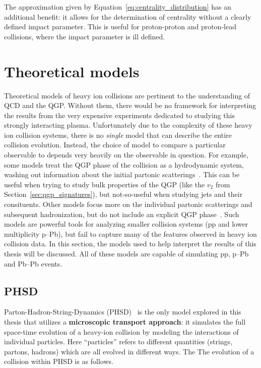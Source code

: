 The approximation given by Equation~\ref{eq:centrality_distribution} has an additional benefit: it allows for the determination of centrality without a clearly defined impact parameter. This is useful for proton-proton and proton-lead collisions, where the impact parameter is ill defined. 


\section{Theoretical models}
\label{sec:models}

Theoretical models of heavy ion collisions are pertinent to the understanding of QCD and the QGP. Without them, there would be no framework for interpreting the results from the very expensive experiments dedicated to studying this strongly interacting plasma. Unfortunately due to the complexity of these heavy ion collision systems, there is no \textit{single} model that can describe the entire collision evolution. Instead, the choice of model to compare a particular observable to depends very heavily on the observable in question. For example, some models treat the QGP phase of the collision as a hydrodynamic system, washing out information about the initial partonic scatterings~\cite{EPOS}. This can be useful when trying to study bulk properties of the QGP (like the $v_2$ from Section~\ref{sec:qgp_signatures}), but not-so-useful when studying jets and their consituents. Other models focus more on the individual partonic scatterings and subsequent hadronization, but do not include an explicit QGP phase~\cite{Pythia, DPMJet}. Such models are powerful tools for analyzing smaller collision systems (pp and lower multiplicity p--Pb), but fail to capture many of the features observed in heavy ion collision data. In this section, the models used to help interpret the results of this thesis will be discussed. All of these models are capable of simulating pp, p--Pb and Pb--Pb events.

\subsection{PHSD}
Parton-Hadron-String-Dynamics (PHSD)~\cite{PHSD1, PHSD2} is the only model explored in this thesis that utilizes a \textbf{microscopic transport approach}: it simulates the full space-time evolution of a heavy-ion collision by modeling the interactions of individual particles. Here ``particles'' refers to different quantities (strings, partons, hadrons) which are all evolved in different ways. The  The evolution of a collision within PHSD is as follows.


